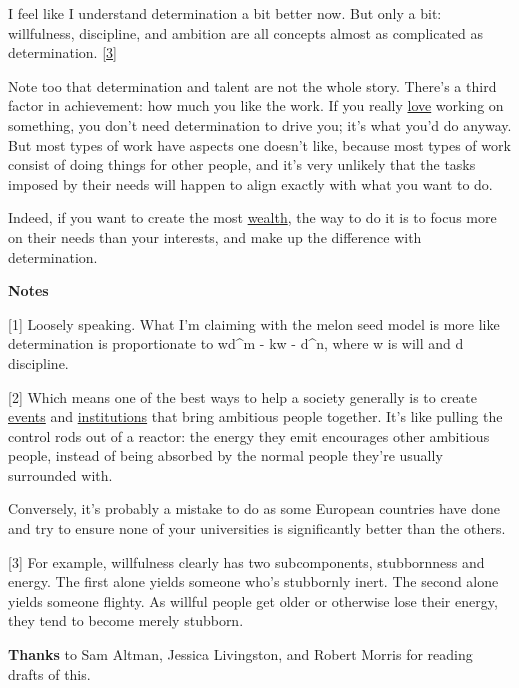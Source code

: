 I feel like I understand determination a bit better now. But only a bit:
willfulness, discipline, and ambition are all concepts almost as
complicated as determination. {[}\hyperref[f3n]{3}{]}

Note too that determination and talent are not the whole story. There's
a third factor in achievement: how much you like the work. If you really
\href{love.html}{love} working on something, you don't need
determination to drive you; it's what you'd do anyway. But most types of
work have aspects one doesn't like, because most types of work consist
of doing things for other people, and it's very unlikely that the tasks
imposed by their needs will happen to align exactly with what you want
to do.

Indeed, if you want to create the most \href{wealth.html}{wealth}, the
way to do it is to focus more on their needs than your interests, and
make up the difference with determination.

\textbf{Notes}

{[}1{]} Loosely speaking. What I'm claiming with the melon seed model is
more like determination is proportionate to wd\^{}m - k\textbar w -
d\textbar\^{}n, where w is will and d discipline.

{[}2{]} Which means one of the best ways to help a society generally is
to create \href{http://startupschool.org}{events} and
\href{http://ycombinator.com}{institutions} that bring ambitious people
together. It's like pulling the control rods out of a reactor: the
energy they emit encourages other ambitious people, instead of being
absorbed by the normal people they're usually surrounded with.

Conversely, it's probably a mistake to do as some European countries
have done and try to ensure none of your universities is significantly
better than the others.

{[}3{]} For example, willfulness clearly has two subcomponents,
stubbornness and energy. The first alone yields someone who's stubbornly
inert. The second alone yields someone flighty. As willful people get
older or otherwise lose their energy, they tend to become merely
stubborn.

\textbf{Thanks} to Sam Altman, Jessica Livingston, and Robert Morris for
reading drafts of this.
